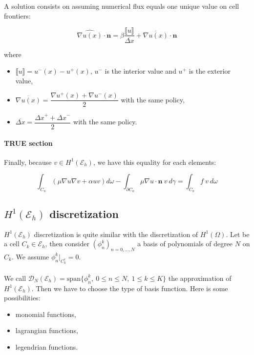 \documentclass[a4paper,10pt]{article}
\begin{document}
A solution consists on assuming numerical flux equals one unique value on cell frontiers:

$$
\widehat{\nabla u(x)} \cdot \mathbf{n} = \beta \frac{\llbracket u \rrbracket}{\overline{\Delta x}} 
+ \overline{\nabla u(x)} \cdot \mathbf{n}
$$

where 
\begin{itemize}
 \item $\llbracket u \rrbracket = u^-(x) - u^+(x)$, $u^-$ is the interior value and $u^+$ is the 
exterior value,
\item $\overline{\nabla u(x)} = \dfrac{\nabla u^+(x) + \nabla u^-(x)}{2} $ with the same policy,
\item $\overline{\Delta x} = \dfrac{{\Delta x}^+ + {\Delta x}^-}{2}$ with the same policy.
\end{itemize}



\paragraph{TRUE section}
\begin{itshape}
 Finally, because $v \in H^1(\mathcal{E}_h)$, we have this equality for each elements:

$$
\int_{C_n} (\mu \nabla u \nabla v + \alpha uv) d\omega - \int_{\partial C_n} \mu \nabla u \cdot 
\mathbf{n}\ v\ d\gamma = \int_{C_n}  f\ v\ d\omega
$$
\end{itshape}


\subsection{$H^1(\mathcal{E}_h)$ discretization}

 $H^1(\mathcal{E}_h)$ discretization is quite similar with the discretization of $H^1(\Omega)$. Let 
be a cell $C_k \in \mathcal{E}_h$, then consider $(\phi_n^k)_{n=0,\dots,N}$ a basis of 
polynomials of degree $N$ on $C_k$. We assume $\phi_n^k|_{C_k^c}=0$.

\paragraph{}
We call $\mathcal{D}_N(\mathcal{E}_h) = \mathrm{span}\{ \phi_n^k ,\ 0\leq n \leq N,\ 1\leq k 
\leq K \}$ the approximation of $H^1(\mathcal{E}_h)$. Then we have to choose the type of basis 
function. Here is some possibilities:
\begin{itemize}
 \item monomial functions,
 \item lagrangian functions,
 \item legendrian functions.
\end{itemize}
\end{document}
